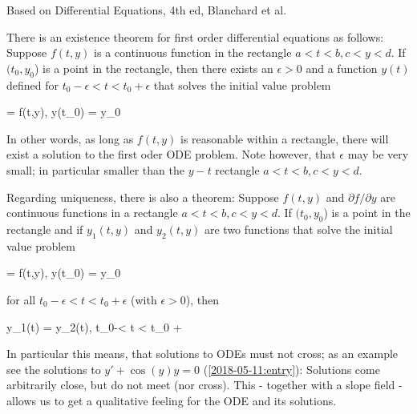 
Based on Differential Equations, 4th ed, Blanchard et al.

There is an existence theorem for first order differential equations as follows: Suppose $f(t,y)$ is a continuous function in the rectangle $a < t < b, c < y < d$. If $(t_0, y_0$) is a point in the rectangle, then there exists an $\epsilon>0$ and a function $y(t)$ defined for $t_0-\epsilon < t < t_0 + \epsilon$ that solves the initial value problem

\bee
{} = f(t,y), \quad y(t_0) = y_0
\eee

In other words, as long as $f(t,y)$ is reasonable within a rectangle, there will exist a solution to the first oder ODE problem. Note however, that $\epsilon$ may be very small; in particular smaller than the $y-t$ rectangle $a < t < b, c < y < d$.

Regarding uniqueness, there is also a theorem: Suppose $f(t,y)$ and $\partial f / \partial y$ are continuous functions in a rectangle $a < t < b, c < y < d$. If $(t_0, y_0$) is a point in the rectangle and if $y_1(t,y)$ and $y_2(t,y)$ are two functions that solve the initial value problem

\bee
{} = f(t,y), \quad y(t_0) = y_0
\eee

for all $t_0-\epsilon < t < t_0 + \epsilon$ (with $\epsilon>0$), then

\bee
y_1(t) = y_2(t), \quad t_0-\epsilon < t < t_0 + \epsilon
\eee

In particular this means, that solutions to ODEs must not cross; as an example see the solutions to $y' + \cos(y)y = 0$ (\ref{2018-05-11:entry}): Solutions come arbitrarily close, but do not meet (nor cross). This - together with a slope field - allows us to get a qualitative feeling for the ODE and its solutions.
